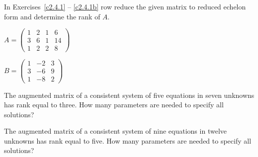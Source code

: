 \EXER

\TEXER

\noindent In Exercises~\ref{c2.4.1} -- \ref{c2.4.1b} row reduce the given 
matrix to reduced echelon form and determine the rank of $A$.
\begin{exercise} \label{c2.4.1}
$A=\left(\begin{array}{rrrr}
1 &  2 & 1 & 6\\
3 &  6 & 1 & 14\\
1 &  2 & 2 & 8
\end{array}\right)$
\end{exercise}
\begin{exercise} \label{c2.4.1b}
$B=\left(\begin{array}{rrr}
1 &  -2 & 3\\
3 &  -6 & 9 \\
1 &  -8 & 2
\end{array}\right)$
\end{exercise}

\begin{exercise} \label{c2.4.2}
The augmented matrix of a consistent system of five equations in seven
unknowns has rank equal to three.  How many parameters are needed to
specify all solutions?
\end{exercise}

\begin{exercise} \label{c2.4.2b}
The augmented matrix of a consistent system of nine equations in twelve
unknowns has rank equal to five.  How many parameters are needed to
specify all solutions?
\end{exercise}




\CEXER

